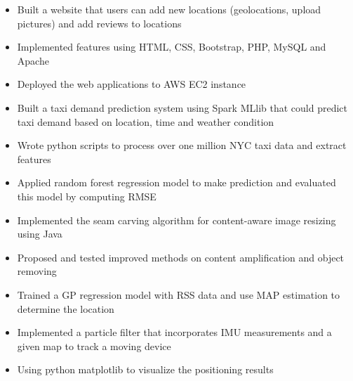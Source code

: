 \documentclass{resume}
\begin{document}
\begin{itemize}
    \item Built a website that users can add new locations (geolocations, upload pictures) and add reviews to locations
    \item Implemented features using HTML, CSS, Bootstrap, PHP, MySQL and Apache
    \item Deployed the web applications to AWS EC2 instance
\end{itemize}



\begin{itemize}
  \item Built a taxi demand prediction system using Spark MLlib that could predict taxi demand based on location, time and weather condition
  \item Wrote python scripts to process over one million NYC taxi data and extract features
  \item Applied random forest regression model to make prediction and evaluated this model by computing RMSE
\end{itemize}

\begin{itemize}
    \item Implemented the seam carving algorithm for content-aware image resizing using Java
    \item Proposed and tested improved methods on content amplification and object removing
\end{itemize}



\begin{itemize}
  \item Trained a GP regression model with RSS data and use MAP estimation to determine the location
  \item  Implemented a particle filter that incorporates IMU measurements and a given map to track a moving device
  \item Using python matplotlib to visualize the positioning results
\end{itemize}
\end{document}
